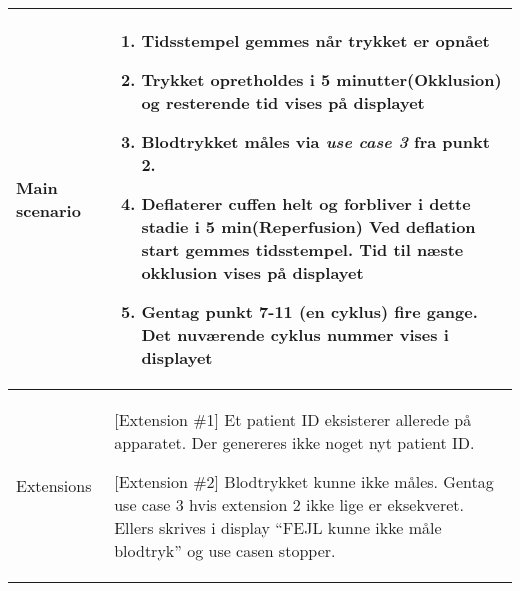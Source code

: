 \begin{center}
\begin{longtable}{ | m{4cm} | m{8cm}| }
			\hline
			Main scenario & \begin{enumerate}
				\setlength\itemsep{0cm} %
				\setcounter{enumi}{7}				
				\item Tidsstempel gemmes når trykket er opnået
				\item Trykket opretholdes i 5 minutter(Okklusion) og resterende tid vises på displayet
				\item Blodtrykket måles via \textit{use case 3}
				fra punkt 2.
				\item Deflaterer cuffen helt og forbliver i dette stadie i 5 min(Reperfusion) Ved deflation start gemmes tidsstempel. Tid til næste okklusion vises på displayet
				\item Gentag punkt 7-11 (en cyklus) fire gange. Det nuværende cyklus nummer vises i displayet
			\end{enumerate} \\ 
			\hline
			Extensions & [Extension \#1] Et patient ID eksisterer allerede på apparatet. Der genereres ikke noget nyt patient ID.
			
			[Extension \#2] Blodtrykket kunne ikke måles. Gentag use case 3 hvis extension 2 ikke lige er eksekveret. Ellers skrives i display “FEJL kunne ikke måle blodtryk” og use casen stopper.  \\
			\hline
		\end{longtable}
		
	\end{center}
	\pagebreak

